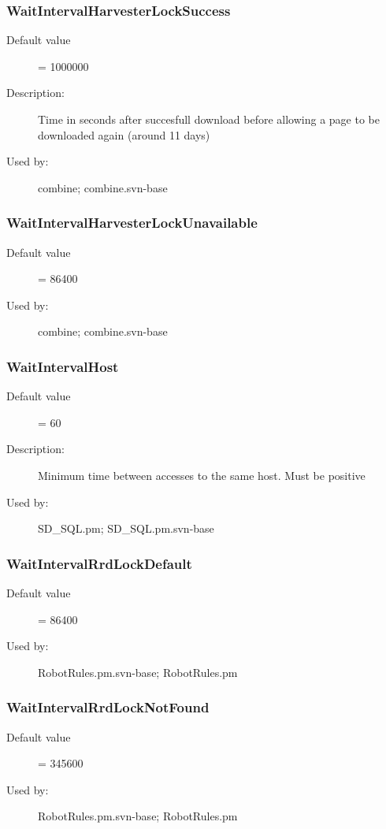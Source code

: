 \subsubsection{WaitIntervalHarvesterLockSuccess}
\label{WaitIntervalHarvesterLockSuccess}
\begin{description}
\item[Default value] = 1000000
\item[Description:] Time in seconds after succesfull download before allowing a page to be downloaded again (around 11 days)
\item[Used by:] combine; combine.svn-base
\end{description}
\subsubsection{WaitIntervalHarvesterLockUnavailable}
\label{WaitIntervalHarvesterLockUnavailable}
\begin{description}
\item[Default value] = 86400
\item[Used by:] combine; combine.svn-base
\end{description}
\subsubsection{WaitIntervalHost}
\label{WaitIntervalHost}
\begin{description}
\item[Default value] = 60
\item[Description:] Minimum time between accesses to the same host. Must be positive
\item[Used by:] SD\_SQL.pm; SD\_SQL.pm.svn-base
\end{description}
\subsubsection{WaitIntervalRrdLockDefault}
\label{WaitIntervalRrdLockDefault}
\begin{description}
\item[Default value] = 86400
\item[Used by:] RobotRules.pm.svn-base; RobotRules.pm
\end{description}
\subsubsection{WaitIntervalRrdLockNotFound}
\label{WaitIntervalRrdLockNotFound}
\begin{description}
\item[Default value] = 345600
\item[Used by:] RobotRules.pm.svn-base; RobotRules.pm
\end{description}
